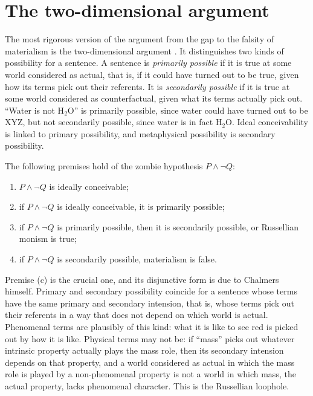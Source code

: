 \documentclass{situationist-preprint}
\begin{document}
\section{The two-dimensional argument}

The most rigorous version of the argument from the gap to the falsity of materialism is the two-dimensional argument \citep{Chalmers1996,Chalmers2009}. It distinguishes two kinds of possibility for a sentence. A sentence is \emph{primarily possible} if it is true at some world considered as actual, that is, if it could have turned out to be true, given how its terms pick out their referents. It is \emph{secondarily possible} if it is true at some world considered as counterfactual, given what its terms actually pick out. \enquote{Water is not H$_2$O} is primarily possible, since water could have turned out to be XYZ, but not secondarily possible, since water is in fact H$_2$O. Ideal conceivability is linked to primary possibility, and metaphysical possibility is secondary possibility.

\begin{assumption}\label{a:2d}
The following premises hold of the zombie hypothesis $P \wedge \neg Q$:
\begin{enumerate}[label=(\alph*),nosep]
\item $P \wedge \neg Q$ is ideally conceivable;
\item if $P \wedge \neg Q$ is ideally conceivable, it is primarily possible;
\item if $P \wedge \neg Q$ is primarily possible, then it is secondarily possible, or Russellian monism is true;
\item if $P \wedge \neg Q$ is secondarily possible, materialism is false.
\end{enumerate}
\end{assumption}

Premise (c) is the crucial one, and its disjunctive form is due to Chalmers himself. Primary and secondary possibility coincide for a sentence whose terms have the same primary and secondary intension, that is, whose terms pick out their referents in a way that does not depend on which world is actual. Phenomenal terms are plausibly of this kind: what it is like to see red is picked out by how it is like. Physical terms may not be: if \enquote{mass} picks out whatever intrinsic property actually plays the mass role, then its secondary intension depends on that property, and a world considered as actual in which the mass role is played by a non-phenomenal property is not a world in which mass, the actual property, lacks phenomenal character. This is the Russellian loophole.
\end{document}
